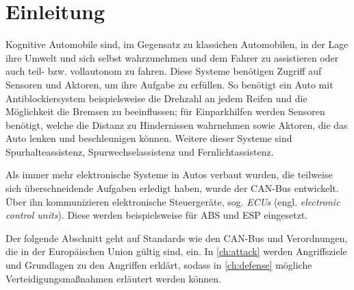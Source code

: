 
\chapter{Einleitung}
Kognitive Automobile sind, im Gegensatz zu klassichen Automobilen, in der Lage
ihre Umwelt und sich selbst wahrzunehmen und dem Fahrer zu assistieren oder
auch teil- bzw. vollautonom zu fahren. Diese Systeme benötigen Zugriff auf
Sensoren und Aktoren, um ihre Aufgabe zu erfüllen. So benötigt ein Auto mit
Antiblockiersystem beispielsweise die Drehzahl an jedem Reifen und die
Möglichkeit die Bremsen zu beeinflussen; für Einparkhilfen werden Sensoren
benötigt, welche die Distanz zu Hindernissen wahrnehmen sowie Aktoren, die das
Auto lenken und beschleunigen können. Weitere dieser Systeme sind
Spurhalteassistenz, Spurwechselassistenz und Fernlichtassistenz.

Als immer mehr elektronische Systeme in Autos verbaut wurden, die teilweise
sich überschneidende Aufgaben erledigt haben, wurde der CAN-Bus
entwickelt\cite{Kiencke1986}. Über ihn kommunizieren elektronische
Steuergeräte, sog. \textit{ECUs} (engl. \textit{electronic control units}).
Diese werden beispielsweise für ABS und ESP eingesetzt. %

Der folgende Abschnitt geht auf Standards wie den CAN-Bus und Verordnungen, die
in der Europäischen Union gültig sind, ein. In \cref{ch:attack} werden
Angriffsziele und Grundlagen zu den Angriffen erklärt, sodass in
\cref{ch:defense} mögliche Verteidigungsmaßnahmen erläutert werden können.